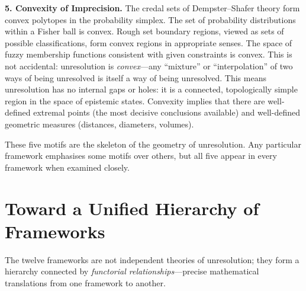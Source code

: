 \documentclass[11pt,letterpaper]{article}
\theoremstyle{definition}
\theoremstyle{remark}
\begin{document}
\textbf{5. Convexity of Imprecision.} The credal sets of Dempster--Shafer theory form convex polytopes in the probability simplex. The set of probability distributions within a Fisher ball is convex. Rough set boundary regions, viewed as sets of possible classifications, form convex regions in appropriate senses. The space of fuzzy membership functions consistent with given constraints is convex. This is not accidental: unresolution is \emph{convex}---any ``mixture'' or ``interpolation'' of two ways of being unresolved is itself a way of being unresolved. This means unresolution has no internal gaps or holes: it is a connected, topologically simple region in the space of epistemic states. Convexity implies that there are well-defined extremal points (the most decisive conclusions available) and well-defined geometric measures (distances, diameters, volumes).

These five motifs are the skeleton of the geometry of unresolution. Any particular framework emphasises some motifs over others, but all five appear in every framework when examined closely.

\newpage

\section{Toward a Unified Hierarchy of Frameworks}
\label{sec:hierarchy}

The twelve frameworks are not independent theories of unresolution; they form a hierarchy connected by \emph{functorial relationships}---precise mathematical translations from one framework to another.

\begin{center}
\end{center}
\end{document}
